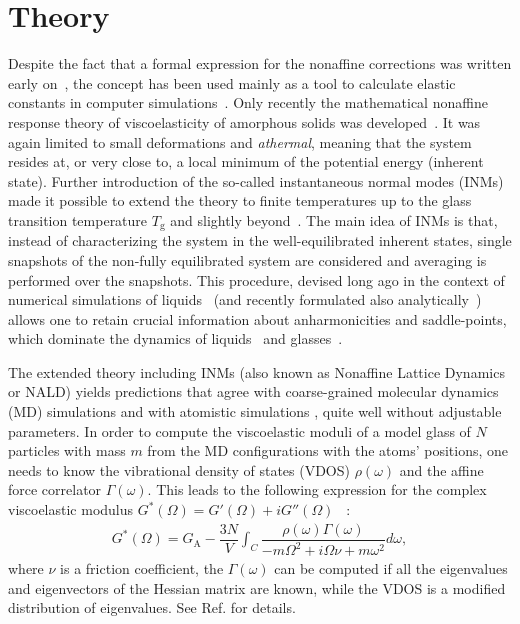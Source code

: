 \documentclass[pre,twocolumn,aps,superscriptaddress,showpacs]{revtex4-1}
\begin{document}
\section{Theory}
Despite the fact that a formal expression for the nonaffine corrections was written early on~\cite{Squire}, the concept has been used mainly as a tool to calculate elastic constants in computer simulations~\cite{Lutsko}. Only recently the mathematical nonaffine response theory of viscoelasticity of amorphous solids was developed~\cite{Lemaitre2006,ZacconeScossa2011,Milkus}. It was again limited to small deformations and \emph{athermal}, meaning that the system resides at, or very close to, a local minimum of the potential energy (inherent state). Further introduction of the so-called instantaneous normal modes (INMs) made it possible to extend the theory to finite temperatures up to the glass transition temperature $T_\text{g}$ and slightly beyond~\cite{Prediction2018}. The main idea of INMs is that, instead of characterizing the system in the well-equilibrated inherent states, single snapshots of the non-fully equilibrated system are considered and averaging is performed over the snapshots. This procedure, devised long ago in the context of numerical simulations of liquids~\cite{Keyes1997,Stratt1995} (and recently formulated also analytically~\cite{PNAS2021}) allows one to retain crucial information about anharmonicities and saddle-points, which dominate the dynamics of liquids~\cite{Mizuno_SciPost} and glasses~\cite{Mizuno_INMs_Bulkley,Karmakar}.

The extended theory including INMs (also known as Nonaffine Lattice Dynamics or NALD) yields predictions that agree with coarse-grained molecular dynamics (MD) simulations \cite{Prediction2018,Ivan2020} and with atomistic simulations \cite{ElderACS}, quite well without adjustable parameters. In order to compute the viscoelastic moduli of a model glass of $N$ particles with mass $m$ from the MD configurations with the atoms' positions, one needs to know the vibrational density of states (VDOS) $\rho(\omega)$ and the affine force correlator $\Gamma(\omega)$. This leads to the following expression for the complex viscoelastic modulus $G^*(\Omega)=G'(\Omega)+iG''(\Omega)$ ~\cite{Lemaitre2006,Prediction2018}:
\begin{eqnarray}\label{complexmodulus}
G^*(\Omega)=G_\text{A}-\dfrac{3N}{V} \int_{C}\dfrac{\rho(\omega)  \Gamma(\omega)}{-m\Omega^2 + i \Omega \nu + m\omega^2}d\omega,
\label{eq:GpGpp}
\end{eqnarray}
where $\nu$ is a friction coefficient, the $\Gamma(\omega)$ can be computed if all the eigenvalues and eigenvectors of the Hessian matrix are known, while the VDOS is a modified distribution of eigenvalues. See Ref.\cite{Prediction2018} for details.
\end{document}
